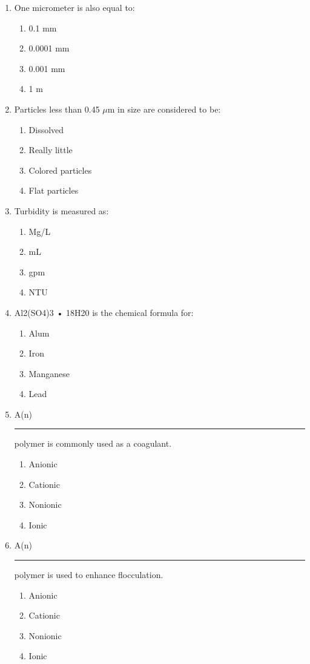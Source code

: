 \begin{enumerate}
\item One micrometer is also equal to:
\begin{enumerate}
\item 0.1 mm
\item 0.0001 mm
\item 0.001 mm
\item 1 m
\end{enumerate}

\item Particles less than 0.45 $\mu\text{m}$ in size are considered to be:
\begin{enumerate}
\item Dissolved
\item Really little
\item Colored particles
\item Flat particles
\end{enumerate}

\item Turbidity is measured as:
\begin{enumerate}
\item Mg/L
\item mL
\item gpm
\item NTU
\end{enumerate}

\item Al2(SO4)3 • 18H20 is the chemical formula for:
\begin{enumerate}
\item Alum
\item Iron
\item Manganese
\item Lead
\end{enumerate}

\item A(n) \rule{1cm}{0.5pt}  polymer is commonly used as a coagulant.
\begin{enumerate}
\item Anionic
\item Cationic
\item Nonionic
\item Ionic
\end{enumerate}

\item A(n) \rule{1cm}{0.5pt}  polymer is used to enhance flocculation.
\begin{enumerate}
\item Anionic
\item Cationic
\item Nonionic
\item Ionic
\end{enumerate}


\end{enumerate}
